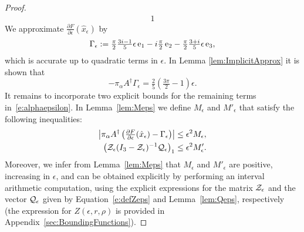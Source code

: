 \begin{proof}
\begin{alignat}{1}
\end{alignat}
We approximate $\frac{\partial F}{\partial  \epsilon}(\hat{x}_\epsilon)$ by 
\[
	\Gamma_\epsilon := \tfrac{\pi}{2} \tfrac{3i -1}{5} \epsilon \, \mathrm{e}_1 - i \tfrac{\pi}{2} \,  \mathrm{e}_2 - \tfrac{\pi}{2} \tfrac{3+i}{5} \epsilon \, \mathrm{e}_3 ,
\]
which is accurate up to quadratic terms in $\epsilon$.
In Lemma \ref{lem:ImplicitApprox} it is shown that
\begin{equation}\label{e:linearepsilon}
- \pi_\alpha A^{\dagger} \Gamma _\epsilon = \tfrac{2}{5} ( \tfrac{3 \pi}{2} -1) \epsilon.
\end{equation}
It remains to incorporate two explicit bounds for the remaining terms in~\eqref{e:alphaepsilon}. 
In Lemma~\ref{lem:Meps} we define $M_\epsilon$ and $M'_\epsilon$ that satisfy the following inequalities:
\begin{alignat}{1}
\left| \pi_\alpha A^{\dagger} \left( \tfrac{\partial F}{\partial  \epsilon}(\hat{x}_\epsilon) - \Gamma_\epsilon \right)  \right| &\leq 
\epsilon^2 M_\epsilon  , \label{e:boundM} \\
%
\left( \ZZ_\epsilon (\II-\ZZ_\epsilon)^{-1} \QQ_\epsilon \right)_1 &\leq 
\epsilon^2 M'_\epsilon . \label{e:boundMp} 
\end{alignat}
Moreover, we infer from Lemma~\ref{lem:Meps} that $M_\epsilon$ and $M'_\epsilon$ are positive, increasing in $\epsilon$, and can be 
obtained explicitly by performing an interval arithmetic computation, using the explicit expressions for the matrix $\mathcal{Z}_\epsilon$ and the vector $\mathcal{Q}_\epsilon$ given by Equation~\eqref{e:defZeps} and Lemma~\ref{lem:Qeps}, respectively (the expression for $Z(\epsilon,r,\rho)$ is provided in Appendix~\ref{sec:BoundingFunctions}).
 

\end{proof}
